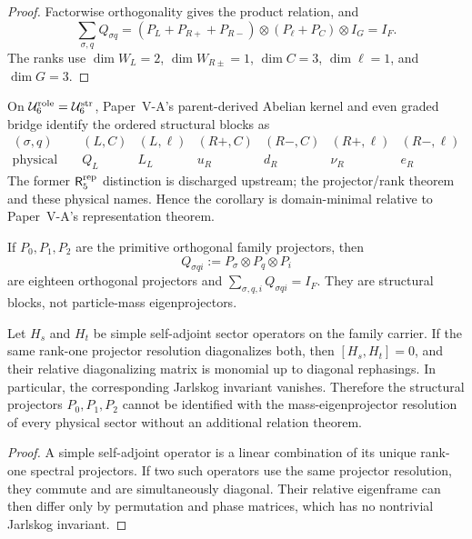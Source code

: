 \documentclass[12pt,a4paper]{article}
\newcommand{\Rrep}{\mathsf R_5^{\rm rep}}
\newcommand{\Ubase}{\mathcal U_6^{\rm str}}
\newcommand{\Urole}{\mathcal U_6^{\rm role}}
\begin{document}
\begin{proof}
Factorwise orthogonality gives the product relation, and
\[
\sum_{\sigma,q}Q_{\sigma q}
=
(P_L+P_{R+}+P_{R-})
\otimes(P_\ell+P_C)\otimes I_G=I_F.
\]
The ranks use
\(\dim W_L=2\), \(\dim W_{R\pm}=1\),
\(\dim C=3\), \(\dim\ell=1\), and \(\dim G=3\).
\end{proof}

\begin{corollary}
\label{p6:cor:physical-role-identification-domain}
On \(\Urole=\Ubase\), Paper~V-A's parent-derived Abelian
kernel and even graded bridge identify the ordered structural blocks as
\[
\begin{array}{c|rrrrrr}
(\sigma,q)&(L,C)&(L,\ell)&(R+,C)&(R-,C)&(R+,\ell)&(R-,\ell)\\
\hline
\text{physical role}&Q_L&L_L&u_R&d_R&\nu_R&e_R
\end{array}
\]
The former \(\Rrep\) distinction is discharged upstream; the projector/rank theorem and these
physical names.  Hence the corollary is domain-minimal relative to Paper~V-A's
representation theorem.
\end{corollary}

\begin{corollary}
\label{p6:cor:eighteen-family-blocks}
If \(P_0,P_1,P_2\) are the primitive orthogonal family projectors, then
\[
Q_{\sigma qi}:=P_\sigma\otimes P_q\otimes P_i
\]
are eighteen orthogonal projectors and
\(
\sum_{\sigma,q,i}Q_{\sigma qi}=I_F
\).
They are structural blocks, not particle-mass eigenprojectors.
\end{corollary}


\begin{corollary}
\label{p6:cor:structural-projector-mass-firewall}
Let \(H_s\) and \(H_t\) be simple self-adjoint sector operators on the
family carrier.  If the same rank-one projector resolution diagonalizes both,
then \([H_s,H_t]=0\), and their relative diagonalizing matrix is monomial up
to diagonal rephasings.  In particular, the corresponding Jarlskog invariant
vanishes.  Therefore the structural projectors
\(P_0,P_1,P_2\) cannot be identified with the mass-eigenprojector resolution
of every physical sector without an additional relation theorem.
\end{corollary}

\begin{proof}
A simple self-adjoint operator is a linear combination of its unique rank-one
spectral projectors.  If two such operators use the same projector resolution,
they commute and are simultaneously diagonal.  Their relative eigenframe can
then differ only by permutation and phase matrices, which has no nontrivial
Jarlskog invariant.
\end{proof}
\end{document}
